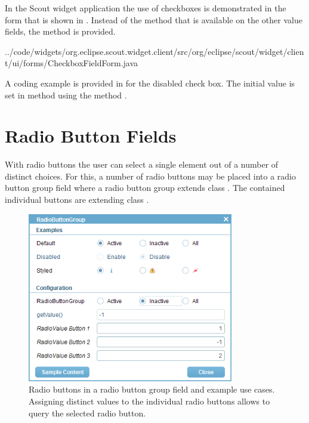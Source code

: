 \documentclass[a4paper,10pt,twoside]{book}
\begin{document}
In the Scout widget application the use of checkboxes is demonstrated in the form  that is shown in .
Instead of the method  that is available on the other value fields, the method  is provided.


{../code/widgets/org.eclipse.scout.widget.client/src/org/eclipse/scout/widget/client/ui/forms/CheckboxFieldForm.java}

A coding example is provided in  for the disabled check box. 
The initial value is set in method  using the method .

\section{Radio Button Fields}

With radio buttons the user can select a single element out of a number of distinct choices. 
For this, a number of radio buttons may be placed into a radio button group field where a radio button group extends class .
The contained individual buttons are extending class .

\begin{figure}
\includegraphics[width=9cm]{radiobuttonfield.png}
\caption{Radio buttons in a radio button group field and example use cases.
Assigning distinct values to the individual radio buttons allows to query the selected radio button.}
\end{figure}
\end{document}
